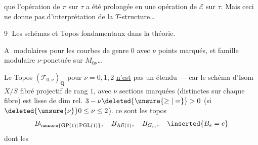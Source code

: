 que l'opération de $\pi$ sur $\tau$ a été prolongée en une opération de $\mathcal E$ sur $\tau$. Mais ceci ne donne pas d'interprétation  de la $T$-structure\ldots
{}

\textcircled{9} Les schémas et Topos fondamentaux dans la théorie.

\textcircled{A}   modulaires  pour les courbes de genre $0$ avec $\nu$ points marqués, et famille  modulaire  $\nu$-ponctuée sur $M_{0\nu}$\ldots

Le Topos $(\mathcal T_{0,\nu})_{\mathbf Q}$ pour $\nu=0,1,2$ \uline{n'est} pas un étendu --- car le schéma d'Isom  $X/S$ fibré projectif de rang $1$, avec $\nu$ sections marquées (distinctes sur chaque fibre) est lisse de dim rel. $3-\nu\deleted{\unsure{\geq|=}}>0$ (si $\deleted{\unsure{\nu}}0\leq\nu\leq2$).
  ce sont les topos
\[
B_{\unsure{\operatorname{GP}(1)|\operatorname{PGL}(1)}},\quad B_{\operatorname{Aff}(1)},\quad B_{G_m},\quad\inserted{B_e=e}
\]
dont les
